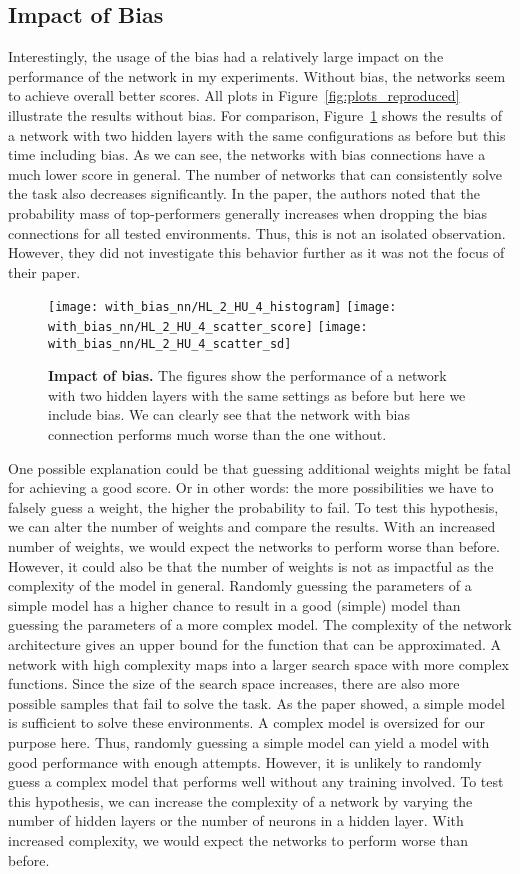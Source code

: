 \subsection{Impact of Bias}
Interestingly, the usage of the bias had a relatively large impact on the performance of the network in my experiments. Without bias, the networks seem to achieve overall better scores. All plots in Figure~\ref{fig:plots_reproduced} illustrate the results without bias. For comparison, Figure~\ref{fig:comparison_bias} shows the results of a network with two hidden layers with the same configurations as before but this time including bias. As we can see, the networks with bias connections have a much lower score in general. The number of networks that can consistently solve the task also decreases significantly. In the paper, the authors noted that the probability mass of top-performers generally increases when dropping the bias connections for all tested environments. Thus, this is not an isolated observation. However, they did not investigate this behavior further as it was not the focus of their paper.
\begin{figure}[ht]
\centering
\texttt{[image: with\_bias\_nn/HL\_2\_HU\_4\_histogram]}
\texttt{[image: with\_bias\_nn/HL\_2\_HU\_4\_scatter\_score]}
\texttt{[image: with\_bias\_nn/HL\_2\_HU\_4\_scatter\_sd]}
\caption[Impact of Bias]{
  \textbf{Impact of bias.}
  The figures show the performance of a network with two hidden layers with the same settings as before but here we include bias. We can clearly see that the network with bias connection performs much worse than the one without.
}
\label{fig:comparison_bias}
\end{figure}
One possible explanation could be that guessing additional weights might be fatal for achieving a good score. Or in other words: the more possibilities we have to falsely guess a weight, the higher the probability to fail. To test this hypothesis, we can alter the number of weights and compare the results. With an increased number of weights, we would expect the networks to perform worse than before. However, it could also be that the number of weights is not as impactful as the complexity of the model in general. Randomly guessing the parameters of a simple model has a higher chance to result in a good (simple) model than guessing the parameters of a more complex model. The complexity of the network architecture gives an upper bound for the function that can be approximated. A network with high complexity maps into a larger search space with more complex functions. Since the size of the search space increases, there are also more possible samples that fail to solve the task. As the paper showed, a simple model is sufficient to solve these environments. A complex model is oversized for our purpose here. Thus, randomly guessing a simple model can yield a model with good performance with enough attempts. However, it is unlikely to randomly guess a complex model that performs well without any training involved. To test this hypothesis, we can increase the complexity of a network by varying the number of hidden layers or the number of neurons in a hidden layer. With increased complexity, we would expect the networks to perform worse than before.

